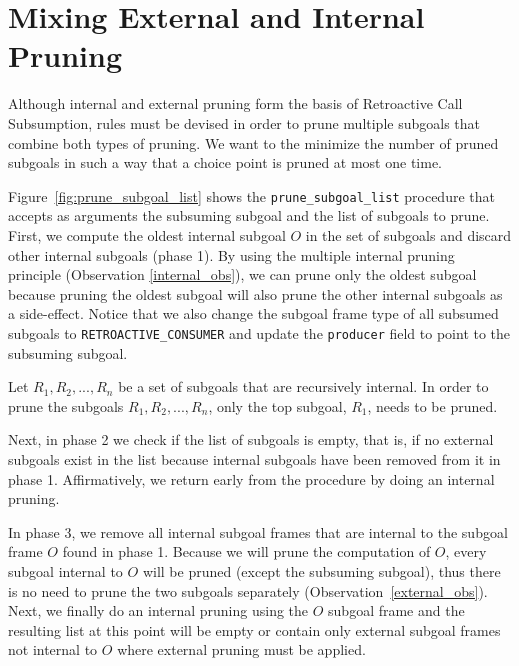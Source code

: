 \section{Mixing External and Internal Pruning}

Although internal and external pruning form the basis of Retroactive Call Subsumption, rules must
be devised in order to prune multiple subgoals that combine both types of pruning. We want to
the minimize the number of pruned subgoals in such a way that a choice point is pruned at
most one time.

Figure~\ref{fig:prune_subgoal_list} shows the \texttt{prune\_subgoal\_list} procedure that accepts
as arguments the subsuming subgoal and the list of subgoals to prune.
First, we compute the oldest internal subgoal $O$ in the set of subgoals and discard other internal
subgoals (phase 1). By using the multiple internal pruning principle (Observation \ref{internal_obs}),
we can prune only the oldest subgoal
because pruning the oldest subgoal will also prune the other internal subgoals as a side-effect.
Notice that we also change the subgoal frame type of all subsumed subgoals to \texttt{RETROACTIVE\_CONSUMER}
and update the \texttt{producer} field to point to the subsuming subgoal.

\begin{samepage}
\begin{pruning_obs}\label{internal_obs}
Let $R_1, R_2, ..., R_n$ be a set of subgoals that are recursively internal. In order to prune the subgoals
$R_1, R_2, ..., R_n$, only the top subgoal, $R_1$, needs to be pruned.
\end{pruning_obs}
\end{samepage}

Next, in phase 2 we check if the list of subgoals is empty, that is, if no external subgoals exist in the list
because internal subgoals have been removed from it in phase 1. Affirmatively, we return early from the procedure
by doing an internal pruning.

In phase 3, we remove all internal subgoal frames that are internal to the subgoal frame $O$ found in phase 1.
Because we will prune the computation of $O$, every subgoal internal to $O$ will be pruned
(except the subsuming subgoal), thus there is no need to prune the two subgoals separately
(Observation~\ref{external_obs}). Next, we finally do an internal pruning using the $O$ subgoal frame
and the resulting list at this point will be empty or contain only external subgoal frames not internal to
$O$ where external pruning must be applied.

